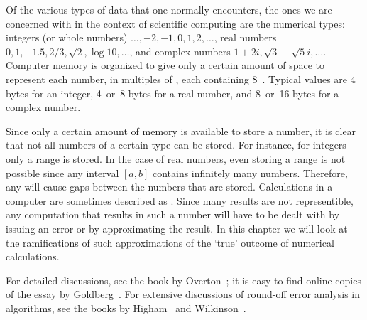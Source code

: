 

Of the various types of data that one normally encounters, the ones we
are concerned with in the context of scientific computing are the
numerical types: integers (or whole numbers)
$\ldots,-2,-1,0,1,2,\ldots$, real numbers $0,1,-1.5,2/3,\sqrt 2,\log
10,\ldots$, and complex numbers $1+2i,\sqrt 3-\sqrt 5i,\ldots$.
Computer memory is organized to give only a certain amount of space to
represent each number, in multiples of , each
containing 8~. Typical values are 4 bytes for an
integer,  4~or~8 bytes for a real number, and 8~or~16 bytes for a
complex number.

Since only a certain amount of memory is available to store a number,
it is clear that not all numbers of a certain type can be stored. For
instance, for integers only a range is stored. In the case of real
numbers, even storing a range is not possible since any interval $[a,b]$
contains infinitely many numbers. Therefore, any
 will cause gaps between the
numbers that are stored. 
Calculations in a computer are sometimes
described as .
Since many results are not representible, any computation that results in
such a number will have to be dealt with by issuing an
error or by approximating the result. 
In this chapter we will look at
the ramifications of such approximations of the `true' outcome of
numerical calculations. 

For detailed discussions, see the book by
Overton~\cite{Overton:754book}; it is easy to find online copies of
the essay by Goldberg~\cite{goldberg:floatingpoint}. For extensive
discussions of round-off error analysis in algorithms, see the books
by Higham~\cite{Higham:2002:ASN} and Wilkinson~\cite{Wilkinson:roundoff}.


